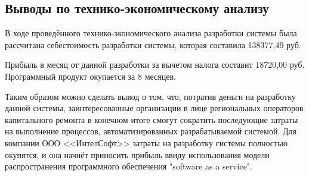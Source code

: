 \subsection{Выводы по технико-экономическому анализу }

В ходе проведённого технико-экономического анализа разработки системы была рассчитана себестоимость разработки системы, которая составила 138377,49 руб.

Прибыль в месяц от данной разработки за вычетом налога составит 18720,00 руб.
Программный продукт окупается за 8 месяцев.

Таким образом можно сделать вывод о том, что, потратив деньги на разработку данной системы, заинтересованные организации в лице региональных операторов капитального ремонта в конечном итоге смогут сократить последующие затраты на выполнение процессов, автоматизированных разрабатываемой системой.
Для компании ООО <<ИнтелСофт>> затраты на разработку системы полностью окупятся, и она начнёт приносить прибыль ввиду использования модели распространения программного обеспечения "software as a service".


\clearpage
\newpage
